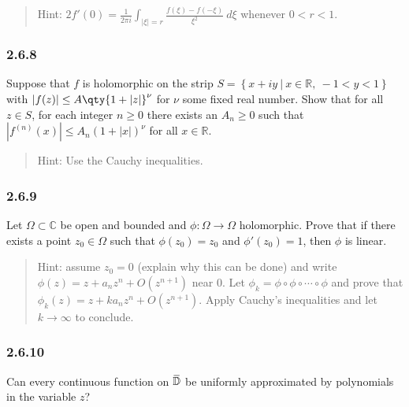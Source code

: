 \begin{quote}
Hint:
\(2f'(0) = \frac{1}{2\pi i} \int_{{\left\lvert {\xi } \right\rvert}= r} \frac{ f(\xi) - f(-\xi) }{\xi^2} ~d\xi\)
whenever \(0<r<1\).
\end{quote}

\hypertarget{section-42}{%
\subsubsection{2.6.8}\label{section-42}}

Suppose that \(f\) is holomorphic on the strip
\(S = \left\{{x+iy {~\mathrel{\Big|}~}x\in {\mathbb{R}},~ -1<y<1}\right\}\)
with
\({\left\lvert {f(z)} \right\rvert} \leq A \qty{1 + {\left\lvert {z} \right\rvert}}^\nu\)
for \(\nu\) some fixed real number. Show that for all \(z\in S\), for
each integer \(n\geq 0\) there exists an \(A_n \geq 0\) such that
\({\left\lvert {f^{(n)}(x)} \right\rvert} \leq A_n (1 + {\left\lvert {x} \right\rvert})^\nu\)
for all \(x\in {\mathbb{R}}\).

\begin{quote}
Hint: Use the Cauchy inequalities.
\end{quote}

\hypertarget{section-43}{%
\subsubsection{2.6.9}\label{section-43}}

Let \(\Omega \subset {\mathbb{C}}\) be open and bounded and
\(\phi: \Omega \to \Omega\) holomorphic. Prove that if there exists a
point \(z_0 \in \Omega\) such that \(\phi(z_0) = z_0\) and
\(\phi'(z_0) = 1\), then \(\phi\) is linear.

\begin{quote}
Hint: assume \(z_0 = 0\) (explain why this can be done) and write
\(\phi(z) = z + a_n z^n + O(z^{n+1})\) near \(0\). Let
\(\phi_k = \phi \circ \phi \circ \cdots \circ \phi\) and prove that
\(\phi_k(z) = z + ka_nz^n + O(z^{n+1})\). Apply Cauchy's inequalities
and let \(k\to \infty\) to conclude.
\end{quote}

\hypertarget{section-44}{%
\subsubsection{2.6.10}\label{section-44}}

Can every continuous function on
\(\mkern 1.5mu\overline{\mkern-1.5mu{\mathbb{D}}\mkern-1.5mu}\mkern 1.5mu\)
be uniformly approximated by polynomials in the variable \(z\)?

